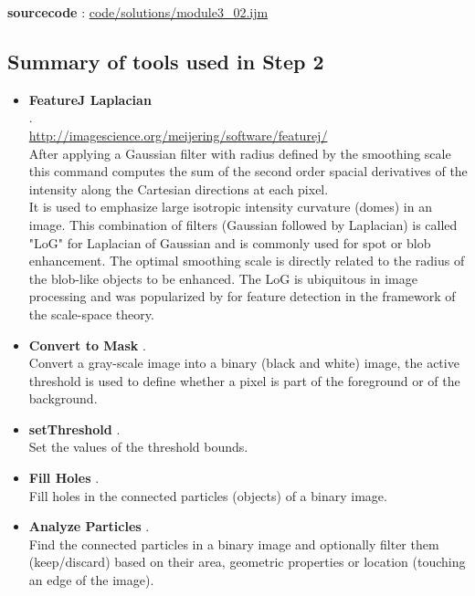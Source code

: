 \textbf{sourcecode} : \href{https://github.com/miura/mod3conversionTest2/blob/struct_authorea/module3_02.ijm}{code/solutions/module3\_02.ijm}

\subsection{Summary of tools used in Step 2}
\label{summary_of_tools_mod_3_step_2}

\begin{itemize}

\item \textbf{FeatureJ Laplacian} \\
.\\
\url{http://imagescience.org/meijering/software/featurej/}\\
 After applying a Gaussian filter with radius defined by the smoothing scale this command computes the sum of the second order spacial derivatives of the intensity along the Cartesian directions at each pixel. \\
It is used to emphasize large isotropic intensity curvature (domes) in an image. This combination of filters (Gaussian followed by Laplacian) is called "LoG" for Laplacian of Gaussian and is commonly used for spot or blob enhancement. The optimal smoothing scale is directly related to the radius of the blob-like objects to be enhanced. The LoG is ubiquitous in image processing and was popularized by \cite{lindeberg1993scale} for feature detection in the framework of the scale-space theory.

\item \textbf{Convert to Mask} .\\
Convert a gray-scale image into a binary (black and white) image, the active threshold is used to define whether a pixel is part of the foreground or of the background.

\item \textbf{setThreshold} .\\
Set the values of the threshold bounds.

\item \textbf{Fill Holes} .\\
Fill holes in the connected particles (objects) of a binary image.

\item \textbf{Analyze Particles} .\\
Find the connected particles in a binary image and optionally filter them (keep/discard) based on their area, geometric properties or location (touching an edge of the image).


\end{itemize}
